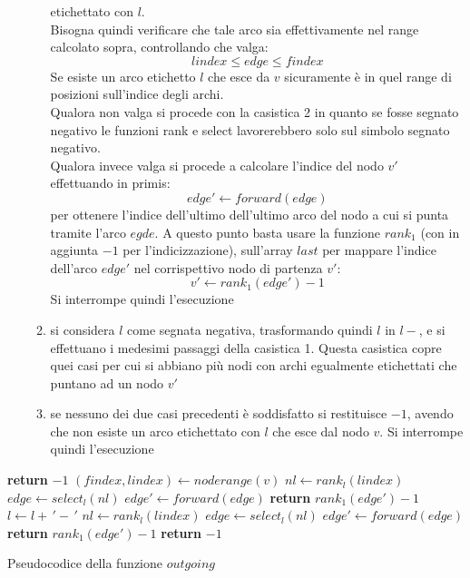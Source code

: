 \documentclass[a4paper,12pt, oneside]{book}
\begin{document}
\begin{itemize}
\begin{enumerate}
    etichettato con $l$.\\
    Bisogna quindi verificare che tale arco sia effettivamente nel range
    calcolato sopra, controllando che valga: 
    \[lindex\leq edge \leq findex\]
    Se esiste un arco etichetto $l$ che esce da $v$ sicuramente è in
    quel range di posizioni sull'indice degli archi.\\
    Qualora non valga si procede con la casistica 2 in quanto se fosse segnato
    negativo le funzioni rank e select lavorerebbero solo sul simbolo segnato
    negativo. \\ 
    Qualora invece valga si procede a calcolare l'indice del nodo $v'$
    effettuando in primis:
    \[edge' \gets forward(edge)\]
    per ottenere l'indice dell'ultimo dell'ultimo arco del nodo a cui si punta
    tramite l'arco $egde$. A questo punto basta usare la funzione $rank_1$ (con
    in aggiunta $-1$ per l'indicizzazione), sull'array $last$ per mappare
    l'indice dell'arco $edge'$ nel corrispettivo nodo di partenza $v'$:
    \[v'\gets rank_1(edge')-1\]
    Si interrompe quindi l'esecuzione
    \item si considera $l$ come segnata negativa, trasformando quindi $l$ in
    $l-$, e si effettuano i medesimi 
    passaggi della casistica 1. Questa
    casistica copre quei casi per cui si abbiano più nodi con archi egualmente
    etichettati che puntano ad un nodo $v'$ 
    \item se nessuno dei due casi precedenti è soddisfatto si restituisce $-1$,
    avendo che non esiste un arco etichettato con $l$ che esce dal nodo $v$. Si
    interrompe quindi l'esecuzione
  \end{enumerate}
\end{itemize}
\begin{algorithm}
  \large
  \begin{algorithmic}
    \State \textbf{return} $-1$
    \EndIf
    \State $(findex, lindex)\gets noderange(v)$
    \State $nl\gets rank_l(lindex)$
    \State $edge\gets select_l(nl)$
    \State $edge'\gets forward(edge)$
    \State \textbf{return} $rank_1(edge')-1$
    \EndIf
    \State $l \gets l+ \,'-\,'$
    \State $nl\gets rank_l(lindex)$
    \State $edge\gets select_l(nl)$
    \State $edge'\gets forward(edge)$
    \State \textbf{return} $rank_1(edge')-1$
    \EndIf
    \State \textbf{return} $-1$
    \EndFunction
  \end{algorithmic}
  \caption{Pseudocodice della funzione $outgoing$}
\end{algorithm}
\end{document}
